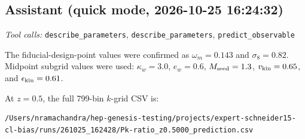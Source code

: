 \documentclass[11pt,a4paper]{article}
\begin{document}
\subsection*{Assistant \small(quick mode, 2026-10-25 16:24:32)}
\textit{Tool calls:} \texttt{describe\_parameters}, \texttt{describe\_parameters}, \texttt{predict\_observable}\par
The fiducial-design-point values were confirmed as \(\omega_m=0.143\) and \(\sigma_8=0.82\). Midpoint subgrid values were used: \(\kappa_w=3.0\), \(e_w=0.6\), \(M_{\rm seed}=1.3\), \(v_{\rm kin}=0.65\), and \(\epsilon_{\rm kin}=0.61\).

At \(z=0.5\), the full 799-bin \(k\)-grid CSV is:

\begin{lstlisting}
/Users/nramachandra/hep-genesis-testing/projects/expert-schneider15-cl-bias/runs/261025_162428/Pk-ratio_z0.5000_prediction.csv

\end{lstlisting}
\end{document}
